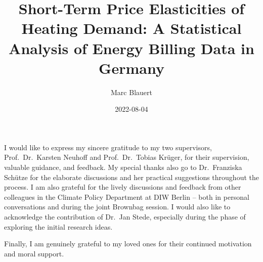 \documentclass[12pt,twoside]{reedthesis}
\title{Short-Term Price Elasticities of Heating Demand: A Statistical Analysis of Energy Billing Data in Germany}
\author{Marc Blauert}
\date{2022-08-04}
\begin{document}
  \maketitle

\frontmatter %
\pagestyle{empty} %
  \begin{acknowledgements}
    I would like to express my sincere gratitude to my two supervisors, Prof.~Dr.~Karsten Neuhoff and Prof.~Dr.~Tobias Krüger, for their supervision, valuable guidance, and feedback. My special thanks also go to Dr.~Franziska Schütze for the elaborate discussions and her practical suggestions throughout the process. I am also grateful for the lively discussions and feedback from other colleagues in the Climate Policy Department at DIW Berlin -- both in personal conversations and during the joint Brownbag session. I would also like to acknowledge the contribution of Dr.~Jan Stede, especially during the phase of exploring the initial research ideas.

    \par
    \bigskip

    Finally, I am genuinely grateful to my loved ones for their continued motivation and moral support.
  \end{acknowledgements}

  \hypersetup{linkcolor=black}
  \setcounter{secnumdepth}{2}
  \setcounter{tocdepth}{2}
  \tableofcontents

  \listoftables
\end{document}
